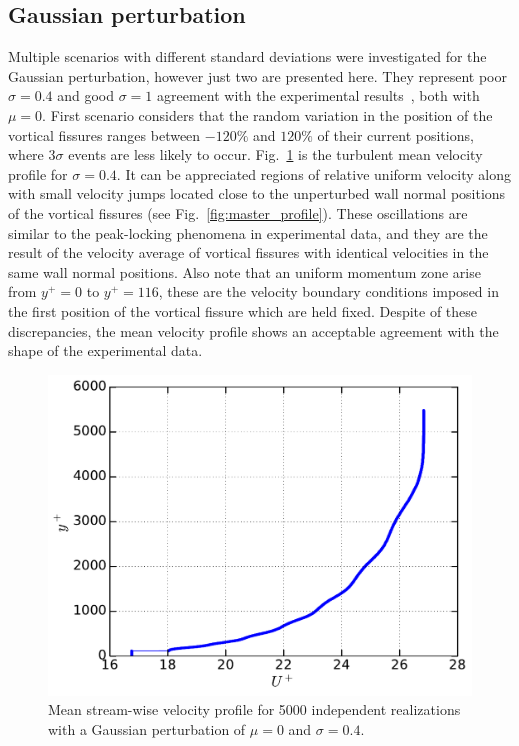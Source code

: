 \documentclass[aps,reprint,amsmath,amssymb,pra]{revtex4-1}%
\begin{document}
\subsection{Gaussian perturbation}
Multiple scenarios with different standard deviations were investigated for the Gaussian perturbation, however just two are presented here. They represent poor $\sigma=0.4$ and good $\sigma=1$ agreement with the experimental results~\cite{Vincenti2013,FLM}, both with $\mu=0$. First scenario considers that the random variation in the position of the vortical fissures ranges between $-120\%$ and $120\%$ of their current positions, where $3\sigma$ events are less likely to occur. Fig.~\ref{fig:mean_profile} is the turbulent mean velocity profile for $\sigma=0.4$. It can be appreciated regions of relative uniform velocity along with small velocity jumps located close to the unperturbed wall normal positions of the vortical fissures (see Fig.~\ref{fig:master_profile}). These oscillations are similar to the peak-locking phenomena in experimental data, and they are the result of  the velocity average of vortical fissures with identical velocities in the same wall normal positions. Also note that an uniform momentum zone arise from $y^+=0$ to $y^+=116$, these are the velocity boundary conditions imposed in the first position of the vortical fissure which are held fixed. Despite of these discrepancies, the mean velocity profile shows an acceptable agreement with the shape of the experimental data.\\
\begin{figure}[b]
\includegraphics[scale=0.46]{figures/Master_averaged_step_profile_5000_assembles}
\caption{\label{fig:mean_profile} Mean stream-wise velocity profile for 5000 independent realizations with a Gaussian perturbation of $\mu=0$ and $\sigma=0.4$.}
\end{figure}
\end{document}
